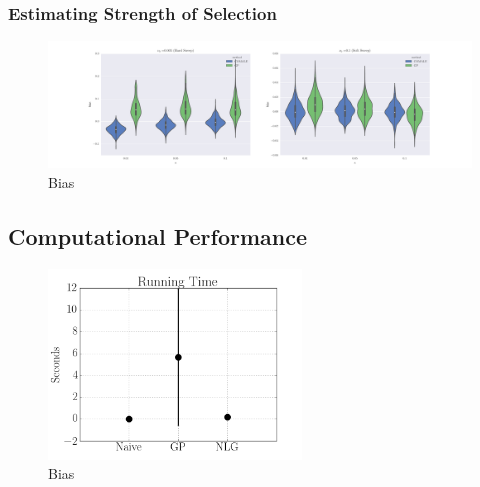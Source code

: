 \subsubsection{Estimating Strength of Selection}
\begin{figure}[H]
  \centering
    \includegraphics[width=\textwidth]{bias}
  \caption{Bias}
  \label{fig:bias}
\end{figure}

\subsection{Computational Performance}
\begin{figure}[H]
  \centering
    \includegraphics[width=0.6\textwidth]{times}
  \caption{Bias}
  \label{fig:bias}
\end{figure}